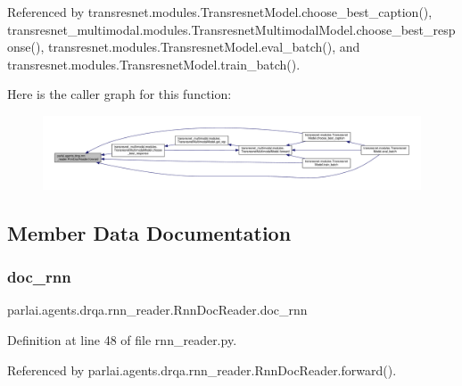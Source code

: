 Referenced by transresnet.\+modules.\+Transresnet\+Model.\+choose\+\_\+best\+\_\+caption(), transresnet\+\_\+multimodal.\+modules.\+Transresnet\+Multimodal\+Model.\+choose\+\_\+best\+\_\+response(), transresnet.\+modules.\+Transresnet\+Model.\+eval\+\_\+batch(), and transresnet.\+modules.\+Transresnet\+Model.\+train\+\_\+batch().

Here is the caller graph for this function\+:
\nopagebreak
\begin{figure}[H]
\begin{center}
\leavevmode
\includegraphics[width=350pt]{classparlai_1_1agents_1_1drqa_1_1rnn__reader_1_1RnnDocReader_ac34674c2a5c3a9b66f10e501725c685a_icgraph}
\end{center}
\end{figure}


\subsection{Member Data Documentation}
\mbox{\label{classparlai_1_1agents_1_1drqa_1_1rnn__reader_1_1RnnDocReader_ad0f835adb34168f24a3b391febb1799c}} 
\subsubsection{\texorpdfstring{doc\+\_\+rnn}{doc\_rnn}}
{\footnotesize\ttfamily parlai.\+agents.\+drqa.\+rnn\+\_\+reader.\+Rnn\+Doc\+Reader.\+doc\+\_\+rnn}



Definition at line 48 of file rnn\+\_\+reader.\+py.



Referenced by parlai.\+agents.\+drqa.\+rnn\+\_\+reader.\+Rnn\+Doc\+Reader.\+forward().

\mbox{\label{classparlai_1_1agents_1_1drqa_1_1rnn__reader_1_1RnnDocReader_ac825a2ff134f93fa9098cab35715fc23}} 
